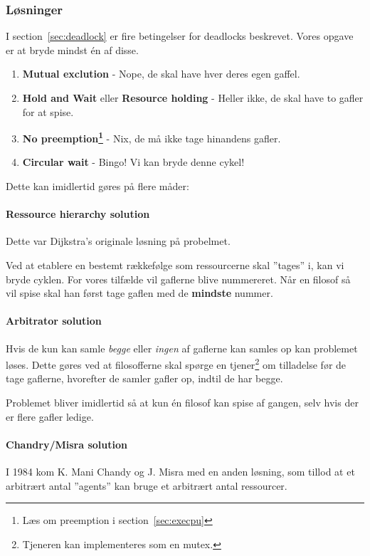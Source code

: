 \subsubsection{Løsninger}
I section~\ref{sec:deadlock} er fire betingelser for deadlocks beskrevet. Vores opgave er at bryde mindst én af disse.

\begin{enumerate}
	\item \textbf{Mutual exclution} - Nope, de skal have hver deres egen gaffel.
	\item \textbf{Hold and Wait} eller \textbf{Resource holding} - Heller ikke, de skal have to gafler for at spise.
	\item \textbf{No preemption\footnote{Læs om preemption i section~\ref{sec:execpu}}} - Nix, de må ikke tage hinandens gafler.
	\item \textbf{Circular wait} - Bingo! Vi kan bryde denne cykel!
\end{enumerate}

Dette kan imidlertid gøres på flere måder:

\paragraph{Ressource hierarchy solution}
Dette var Dijkstra's originale løsning på probelmet.

Ved at etablere en bestemt rækkefølge som ressourcerne skal ''tages'' i, kan vi bryde cyklen. For vores tilfælde vil gaflerne blive nummereret. Når en filosof så vil spise skal han først tage gaflen med de \textbf{mindste} nummer.

\paragraph{Arbitrator solution}
Hvis de kun kan samle \textit{begge} eller \textit{ingen} af gaflerne kan samles op kan problemet løses. Dette gøres ved at filosofferne skal spørge en tjener\footnote{Tjeneren kan implementeres som en mutex.} om tilladelse før de tage gaflerne, hvorefter de samler gafler op, indtil de har begge. 

Problemet bliver imidlertid så at kun én filosof kan spise af gangen, selv hvis der er flere gafler ledige.

\paragraph{Chandry/Misra solution}
I 1984 kom K. Mani Chandy og J. Misra med en anden løsning, som tillod at et arbitrært antal ''agents'' kan bruge et arbitrært antal ressourcer.

